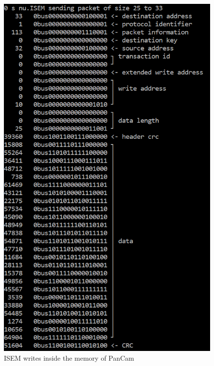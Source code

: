 \documentclass[12pt,a4paper]{article}
\begin{document}
\begin{figure}[hb]
	\centering
    \includegraphics[scale = 0.5]{results/ISEM_write.png}
    \caption{ISEM writes inside the memory of PanCam}
\end{figure}
\end{document}
